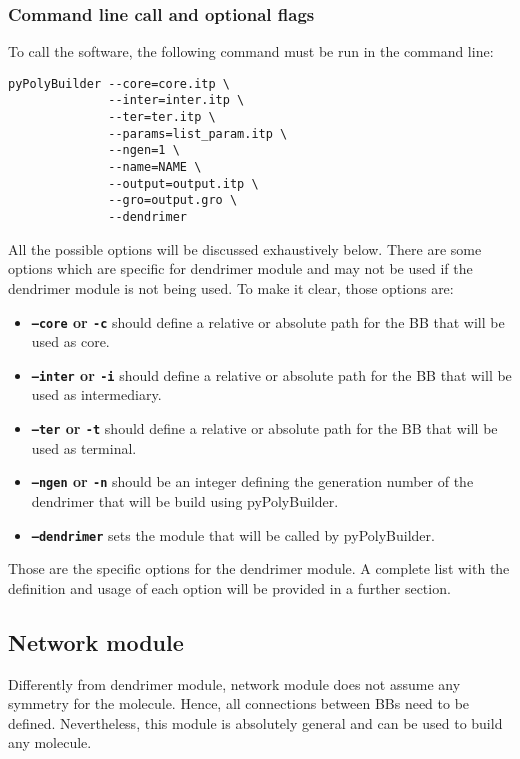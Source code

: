 \documentclass[12pt]{article}
\begin{document}
\subsubsection{Command line call and optional flags}

To call the software, the following command must be run in the command line:

\begin{lstlisting}
pyPolyBuilder --core=core.itp \
              --inter=inter.itp \
              --ter=ter.itp \
              --params=list_param.itp \
              --ngen=1 \
              --name=NAME \
              --output=output.itp \
              --gro=output.gro \
              --dendrimer
\end{lstlisting}

All the possible options will be discussed exhaustively below.
There are some options which are specific for dendrimer module and may not be used if the dendrimer module is not being used.
To make it clear, those options are:

\begin{itemize}
    \item \textbf{\texttt{--core} or \texttt{-c}} should define a relative or absolute path for the BB that will be used as core.
        
    \item \textbf{\texttt{--inter} or \texttt{-i}} should define a relative or absolute path for the BB that will be used as intermediary.
    
    \item \textbf{\texttt{--ter} or \texttt{-t}} should define a relative or absolute path for the BB that will be used as terminal.
    
    \item \textbf{\texttt{--ngen} or \texttt{-n}} should be an integer defining the generation number of the dendrimer that will be build using pyPolyBuilder.
    
    \item \textbf{\texttt{--dendrimer}} sets the module that will be called by pyPolyBuilder.
\end{itemize}

Those are the specific options for the dendrimer module.
A complete list with the definition and usage of each option will be provided in a further section.

\subsection{Network module}
Differently from dendrimer module, network module does not assume any symmetry for the molecule.
Hence, all connections between BBs need to be defined.
Nevertheless, this module is absolutely general and can be used to build any molecule.
\end{document}
